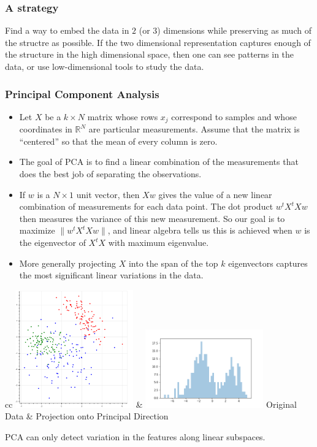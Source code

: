 \documentclass{beamer}
\newcommand{\R}{\mathbb{R}}
\begin{document}
\begin{frame}
  \frametitle{A strategy}
  Find a way to embed the data in $2$ (or $3$) dimensions while preserving as much of the structre as possible.
  If the two dimensional representation captures enough of the structure in the high dimensional space, then one can see patterns in the data,
  or use low-dimensional tools to study the data.

\end{frame}
\begin{frame}
  \frametitle{Principal Component Analysis}
\begin{itemize}
\item   Let $X$ be a $k\times N$ matrix whose rows $x_{j}$ correspond to samples and whose coordinates in $\R^{N}$ are particular measurements.  Assume that the matrix is ``centered'' so that the mean of every column is zero.

\item  The goal of PCA is to find a linear combination of the measurements that does the best job of separating the observations.

\item   If $w$ is a $N\times 1$ unit vector,  then $Xw$ gives the value of a new linear combination of measurements for each data point. The
  dot product $w^tX^tXw$ then measures the variance of this new measurement.  So our goal is to maximize $\|w^{t}X^{t}Xw\|$,
  and linear algebra tells us this is achieved when $w$ is the eigenvector of $X^{t}X$ with maximum eigenvalue.

\item   More generally projecting $X$ into the span of the top $k$ eigenvectors captures the most significant linear variations in the data.
\end{itemize}
\end{frame}
\begin{frame}
  \begin{center}
  \begin{tabular}{cc}
  \includegraphics[width=2in]{pca_data.png} &
  \includegraphics[width=2in]{pca_hist.png}\cr
  {\small Original Data} & {\small Projection onto Principal Direction} \cr
  \end{tabular}

  PCA can only detect variation in the features along linear subspaces.
\end{center}
\end{frame}
\end{document}
